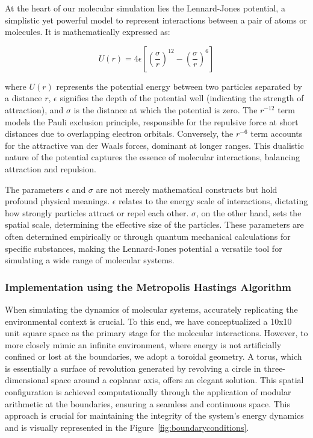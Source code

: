 \documentclass{article}
\begin{document}
At the heart of our molecular simulation lies the Lennard-Jones potential, a simplistic yet powerful model to represent interactions between a pair of atoms or molecules. It is mathematically expressed as:

\[
	U(r) = 4\epsilon \left[ \left( \frac{\sigma}{r} \right)^{12} - \left( \frac{\sigma}{r} \right)^6 \right]
\]

where \( U(r) \) represents the potential energy between two particles separated by a distance \( r \), \( \epsilon \) signifies the depth of the potential well (indicating the strength of attraction), and \( \sigma \) is the distance at which the potential is zero. The \( r^{-12} \) term models the Pauli exclusion principle, responsible for the repulsive force at short distances due to overlapping electron orbitals. Conversely, the \( r^{-6} \) term accounts for the attractive van der Waals forces, dominant at longer ranges. This dualistic nature of the potential captures the essence of molecular interactions, balancing attraction and repulsion.

The parameters \( \epsilon \) and \( \sigma \) are not merely mathematical constructs but hold profound physical meanings. \( \epsilon \) relates to the energy scale of interactions, dictating how strongly particles attract or repel each other. \( \sigma \), on the other hand, sets the spatial scale, determining the effective size of the particles. These parameters are often determined empirically or through quantum mechanical calculations for specific substances, making the Lennard-Jones potential a versatile tool for simulating a wide range of molecular systems.

\subsubsection{Implementation using the Metropolis Hastings Algorithm}

When simulating the dynamics of molecular systems, accurately replicating the environmental context is crucial. To this end, we have conceptualized a 10x10 unit square space as the primary stage for the molecular interactions. However, to more closely mimic an infinite environment, where energy is not artificially confined or lost at the boundaries, we adopt a toroidal geometry. A torus, which is essentially a surface of revolution generated by revolving a circle in three-dimensional space around a coplanar axis, offers an elegant solution. This spatial configuration is achieved computationally through the application of modular arithmetic at the boundaries, ensuring a seamless and continuous space. This approach is crucial for maintaining the integrity of the system's energy dynamics and is visually represented in the Figure~\ref{fig:boundaryconditions}.
\end{document}
